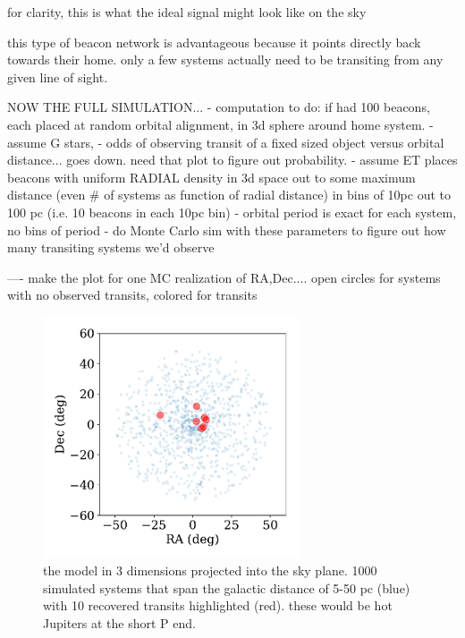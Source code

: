 \documentclass[twocolumn]{aastex62}
\begin{document}
for clarity, this is what the ideal signal might look like on the sky



this type of beacon network is advantageous because it points directly back towards their home. only a few systems actually need to be transiting from any given line of sight.

NOW THE FULL SIMULATION...
- computation to do: if had 100 beacons, each placed at random orbital alignment, in 3d sphere around home system.
- assume G stars, 
- odds of observing transit of a fixed sized object versus orbital distance... goes down. need that plot to figure out probability. 
- assume ET places beacons with uniform RADIAL density in 3d space out to some maximum distance (even \# of systems as function of radial distance) in bins of 10pc out to 100 pc (i.e. 10 beacons in each 10pc bin)
- orbital period is exact for each system, no bins of period
- do Monte Carlo sim with these parameters to figure out how many transiting systems we'd observe 

---- make the plot for one MC realization of RA,Dec.... open circles for systems with no observed transits, colored for transits

\begin{figure}[]
\centering
\includegraphics[width=3in]{../figures/3d_model.pdf}
\caption{the model in 3 dimensions projected into the sky plane. 1000 simulated systems that span the galactic distance of 5-50 pc (blue) with 10 recovered transits highlighted (red). these would be hot Jupiters at the short P end.}
\label{fig:3d}
\end{figure}
\end{document}
